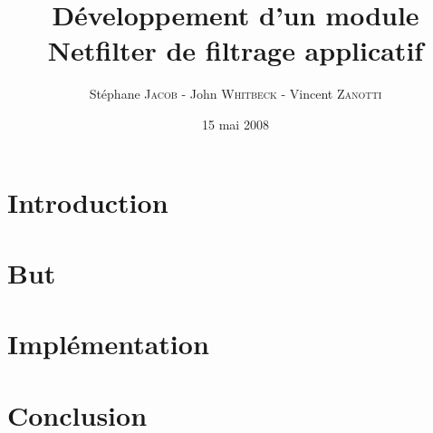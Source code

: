 \documentclass[a4paper,12pt]{article}
\title{Développement d’un module Netfilter de filtrage applicatif}
\author{Stéphane \textsc{Jacob} - John \textsc{Whitbeck} - Vincent \textsc{Zanotti}}
\date{15 mai 2008}
\begin{document}
\maketitle

\section*{Introduction}


\section{But}

\newpage

\section{Implémentation}


\section*{Conclusion}


\nocite{RW}
\nocite{l7}
\nocite{C}
\nocite{S}

\newpage
{}

\end{document}
